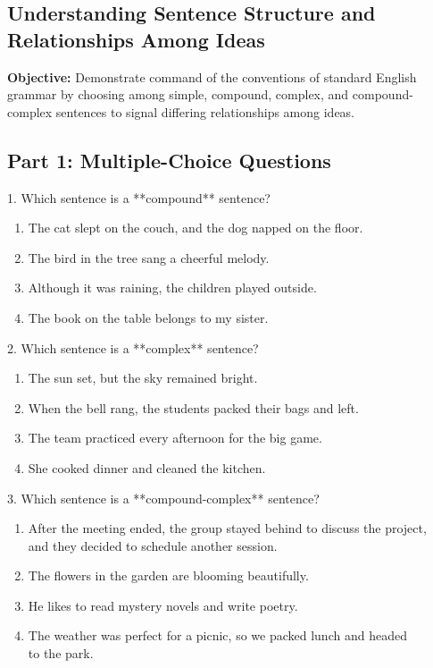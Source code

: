 \documentclass[12pt]{article}
\begin{document}
\subsection*{Understanding Sentence Structure and Relationships Among Ideas}
\onehalfspacing

\begin{tcolorbox}[colframe=black!40, colback=gray!0, title=Learning Objective]
\textbf{Objective:} Demonstrate command of the conventions of standard English grammar by choosing among simple, compound, complex, and compound-complex sentences to signal differing relationships among ideas.
\end{tcolorbox}

\subsection*{Part 1: Multiple-Choice Questions}

1. Which sentence is a **compound** sentence?  
\begin{enumerate}[label=\Alph*.]
    \item The cat slept on the couch, and the dog napped on the floor.  
    \item The bird in the tree sang a cheerful melody.  
    \item Although it was raining, the children played outside.  
    \item The book on the table belongs to my sister.  
\end{enumerate}

\vspace{1cm}

2. Which sentence is a **complex** sentence?  
\begin{enumerate}[label=\Alph*.]
    \item The sun set, but the sky remained bright.  
    \item When the bell rang, the students packed their bags and left.  
    \item The team practiced every afternoon for the big game.  
    \item She cooked dinner and cleaned the kitchen.  
\end{enumerate}

\vspace{1cm}

3. Which sentence is a **compound-complex** sentence?  
\begin{enumerate}[label=\Alph*.]
    \item After the meeting ended, the group stayed behind to discuss the project, \\and they decided to schedule another session.  
    \item The flowers in the garden are blooming beautifully.  
    \item He likes to read mystery novels and write poetry.  
    \item The weather was perfect for a picnic, so we packed lunch and headed \\to the park.  
\end{enumerate}
\end{document}

